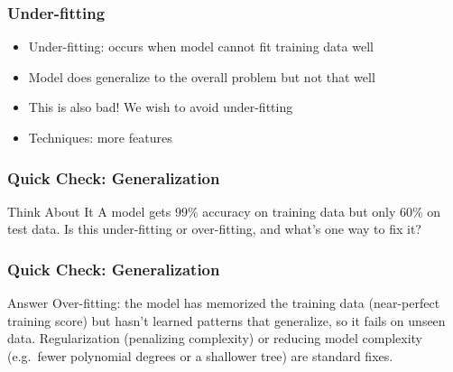 

	



\begin{frame}[fragile]\frametitle{Under-fitting}
\begin{itemize}
\item Under-fitting: occurs when model cannot fit training data well
\item Model does generalize to the overall problem but not that well
\item This is also bad! We wish to avoid under-fitting
\item Techniques: more features
\end{itemize}
\end{frame}

\begin{frame}[fragile]\frametitle{Quick Check: Generalization}
\begin{block}{Think About It}
A model gets 99\% accuracy on training data but only 60\% on test data. Is this under-fitting or over-fitting, and what's one way to fix it?
\end{block}
\end{frame}

\begin{frame}[fragile]\frametitle{Quick Check: Generalization}
\begin{block}{Answer}
Over-fitting: the model has memorized the training data (near-perfect training score) but hasn't learned patterns that generalize, so it fails on unseen data. Regularization (penalizing complexity) or reducing model complexity (e.g.\ fewer polynomial degrees or a shallower tree) are standard fixes.
\end{block}
\end{frame}

